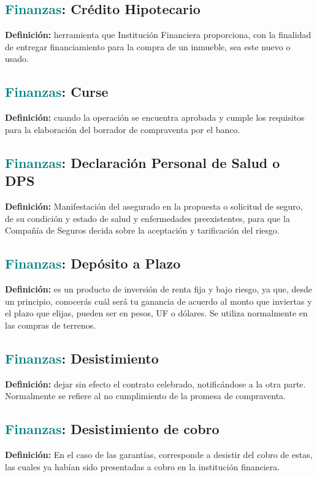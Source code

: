 \documentclass[12pt]{article}
\begin{document}
\subsection{\textcolor{teal}{Finanzas}: Crédito Hipotecario}
\textbf{Definición:} herramienta que Institución Financiera proporciona, con la finalidad de entregar financiamiento para la compra de un inmueble, sea este nuevo o usado.
\subsection{\textcolor{teal}{Finanzas}: Curse}
\textbf{Definición:} cuando la operación se encuentra aprobada y cumple los requisitos para la elaboración del borrador de compraventa por el banco.
\subsection{\textcolor{teal}{Finanzas}: Declaración Personal de Salud o DPS}
\textbf{Definición:} Manifestación del asegurado en la propuesta o solicitud de seguro, de su condición y estado de salud y enfermedades preexistentes, para que la Compañía de Seguros decida sobre la aceptación y tarificación del riesgo.
\subsection{\textcolor{teal}{Finanzas}: Depósito a Plazo}
\textbf{Definición:} es un producto de inversión de renta fija y bajo riesgo, ya que, desde un principio, conocerás cuál será tu ganancia de acuerdo al monto que inviertas y el plazo que elijas, pueden ser en pesos, UF o dólares. Se utiliza normalmente en las compras de terrenos.
\subsection{\textcolor{teal}{Finanzas}: Desistimiento}
\textbf{Definición:} dejar sin efecto el contrato celebrado, notificándose a la otra parte. Normalmente se refiere al no cumplimiento de la promesa de compraventa. 
\subsection{\textcolor{teal}{Finanzas}: Desistimiento de cobro}
\textbf{Definición:} En el caso de las garantías, corresponde a desistir del cobro de estas, las cuales ya habían sido presentadas a cobro en la institución financiera.
\end{document}
